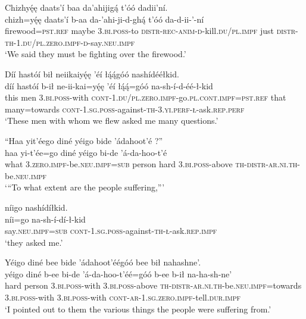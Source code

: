\ea\label{ex:text9-5-10}
Chizhyę́ę daats’í baa da’ahijigą́ t’óó dadii’ní.\\
\gll chizh=yę́ę	daats’í	b-aa	da-’ahi-ji-d-ghą́	t’óó	da-d-ii-’-ní\\
     firewood=\textsc{pst}.\textsc{ref}	maybe	3.\textsc{bi}.\textsc{poss}-to	\textsc{distr}-\textsc{rec}-\textsc{anim}-\textsc{d}-kill.\textsc{du}/\textsc{pl}.\textsc{impf}	just	\textsc{distr}-\textsc{th}-1.\textsc{du}/\textsc{pl}.\textsc{zero}.\textsc{impf}-\textsc{d}-say.\textsc{neu}.\textsc{impf}\\
\glt `We said they must be fighting over the firewood.'
\z

\ea\label{ex:text9-6-1}
Díí hastóí bił neiikaiyę́ę ’éí łą́ą́góó nashídééłkid.\\
\gll díí	hastóí	b-ił	ne-ii-kai=yę́ę	’éí	łą́ą́=góó	na-sh-í-d-éé-ł-kid\\
     this	men	3.\textsc{bi}.\textsc{poss}-with	\textsc{cont}-1.\textsc{du}/\textsc{pl}.\textsc{zero}.\textsc{impf}-go.\textsc{pl}.\textsc{cont}.\textsc{impf}=\textsc{pst}.\textsc{ref}	that	many=towards	\textsc{cont}-1.\textsc{sg}.\textsc{poss}-against-\textsc{th}-3.\textsc{yi}.\textsc{perf}-\textsc{ł}-ask.\textsc{rep}.\textsc{perf}\\
\glt `These men with whom we flew asked me many questions.'
\z

\ea\label{ex:text9-6-2}
``Haa yit’éego diné yéigo bide ’ádahoot’é ?''\\
\gll haa	yi-t’ée=go	diné	yéigo	bi-de	’á-da-hoo-t’é\\
     what	3.\textsc{zero}.\textsc{impf}-be.\textsc{neu}.\textsc{impf}=\textsc{sub}	person	hard	3.\textsc{bi}.\textsc{poss}-above	\textsc{th}-\textsc{distr}-\textsc{ar}.\textsc{ni}.\textsc{th}-be.\textsc{neu}.\textsc{impf}\\
\glt `“To what extent are the people suffering,'''
\z

\ea\label{ex:text9-6-3}
níigo nashídíłkid.\\
\gll níi=go	na-sh-í-dí-ł-kid\\
     say.\textsc{neu}.\textsc{impf}=\textsc{sub}	\textsc{cont}-1.\textsc{sg}.\textsc{poss}-against-\textsc{th}-\textsc{ł}-ask.\textsc{rep}.\textsc{impf}\\
\glt `they asked me.'
\z

\ea\label{ex:text9-6-4}
Yéigo diné bee bide ’ádahoot’éégóó bee bił nahashne’.\\
\gll yéigo	diné	b-ee	bi-de	’á-da-hoo-t’éé=góó	b-ee	b-ił	na-ha-sh-ne’\\
     hard	person	3.\textsc{bi}.\textsc{poss}-with	3.\textsc{bi}.\textsc{poss}-above	\textsc{th}-\textsc{distr}-\textsc{ar}.\textsc{ni}.\textsc{th}-be.\textsc{neu}.\textsc{impf}=towards	3.\textsc{bi}.\textsc{poss}-with	3.\textsc{bi}.\textsc{poss}-with	\textsc{cont}-\textsc{ar}-1.\textsc{sg}.\textsc{zero}.\textsc{impf}-tell.\textsc{dur}.\textsc{impf}\\
\glt `I pointed out to them the various things the people were suffering from.'
\z

